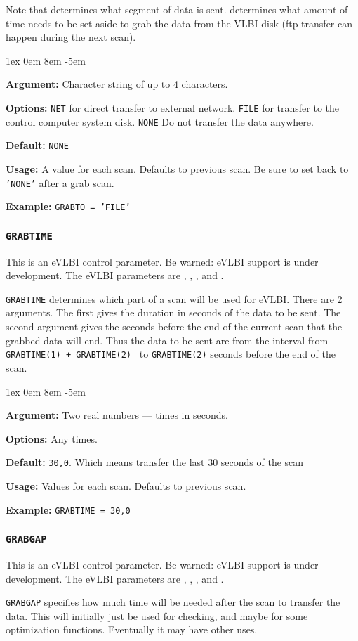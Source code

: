 \documentclass{report}
\newcommand{\rcwbox}[5]{
  \begin{list}{}{\parsep 1ex  \itemsep 0em
                 \leftmargin 8em  \itemindent -5em }
    \item {\bf Argument:} #1
    \item {\bf Options:}  #2
    \item {\bf Default:}  #3
    \item {\bf Usage:}    #4
    \item {\bf Example:}  #5
  \end{list}
}
\begin{document}
Note that  determines what
segment of data is sent.   determines
what amount of time needs to be set aside to grab the data from the
VLBI disk (ftp transfer can happen during the next scan).

\rcwbox
{ Character string of up to 4 characters.}
{{\tt NET} for direct transfer to external network.
 {\tt FILE} for transfer to the control computer system disk.
 {\tt NONE} Do not transfer the data anywhere.}
{{\tt NONE}}
{A value for each scan.  Defaults to previous scan.  Be sure to set
back to {\tt 'NONE'} after a grab scan.}
{{\tt GRABTO = 'FILE' }}

\subsubsection{\label{MP:GRABTIME}{\tt GRABTIME}}

This is an eVLBI control parameter.  Be warned: eVLBI support is
under development.
The eVLBI parameters are ,
, ,
and .

{\tt GRABTIME} determines which part of a scan will be used for
eVLBI.  There are 2 arguments.  The first gives the duration in
seconds of the data to be sent.  The second argument gives the
seconds before the end of the current scan that the grabbed data
will end.  Thus the data to be sent are from the interval from
{\tt GRABTIME(1) + GRABTIME(2) } to {\tt GRABTIME(2)} seconds
before the end of the scan.


\rcwbox
{ Two real numbers --- times in seconds.}
{ Any times.}
{{\tt 30,0}.  Which means transfer the last 30 seconds of the scan}
{Values for each scan.  Defaults to previous scan.}
{{\tt GRABTIME = 30,0 }}


\subsubsection{\label{MP:GRABGAP}{\tt GRABGAP}}

This is an eVLBI control parameter.  Be warned: eVLBI support is
under development.
The eVLBI parameters are ,
, ,
and .

{\tt GRABGAP} specifies how much time will be needed after the
scan to transfer the data.  This will initially just be used for
checking, and maybe for some optimization functions.  Eventually
it may have other uses.
\end{document}
